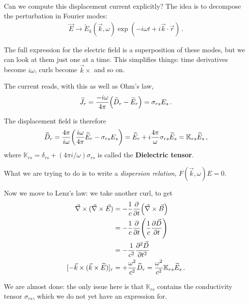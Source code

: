\documentclass[main.tex]{subfiles}
\begin{document}
Can we compute this displacement current explicitly?
The idea is to decompose the perturbation in Fourier modes:
%
\begin{align}
 \vec{E} \to \widetilde{E}_k (\vec{k}, \omega ) \exp(- i \omega t + i \vec{k} \cdot \vec{r})
\,.
\end{align}

The full expression for the electric field is a superposition of these modes, but we can look at them just one at a time. 
This simplifies things: time derivatives become \(i \omega \), curls become \(\vec{k} \times \) and so on. 

The current reads, with this as well as Ohm's law,
%
\begin{align}
\widetilde{J} _r = \frac{- i \omega }{4 \pi } \qty(\widetilde{D}_r - \widetilde{E}_r) = \sigma_{rs} E_s
\,.
\end{align}

The displacement field is therefore 
%
\begin{align}
\widetilde{D}_r
= \frac{4 \pi }{ i \omega } \qty(\frac{i \omega }{ 4 \pi } \widetilde{E}_r - \sigma_{rs} E_s) = \widetilde{E}_r
+ i \frac{4 \pi }{\omega } \sigma_{rs} \widetilde{E}_s 
= \mathbb{K}_{rs} \widetilde{E}_s
\,,
\end{align}
%
where \(\mathbb{K}_{rs} = \delta_{rs} + (4 \pi i / \omega ) \sigma_{rs}\) is called the \textbf{Dielectric tensor}.

What we are trying to do is to write a \emph{dispersion relation}, \(F(\vec{k}, \omega ) E = 0\). 

Now we move to Lenz's law: we take another curl, to get 
%
\begin{subequations}
\begin{align}
\vec{\nabla} \times (\vec{\nabla} \times \vec{E}) &= - \frac{1}{c} \pdv{}{t} \qty(\vec{\nabla} \times \vec{B})   \\
&= - \frac{1}{c} \pdv{}{t} \qty( \frac{1}{c}\pdv{\vec{D}}{t})  \\
&= - \frac{1}{c^2} \pdv[2]{\vec{D}}{t}  \\
[- \vec{k} \times (\vec{k} \times \widetilde{E})]_r &= + \frac{\omega^2}{c^2} \widetilde{D}_r = \frac{\omega^2}{c^2} \mathbb{K}_{rs} \widetilde{E}_s
\,.
\end{align}
\end{subequations}

We are almost done: the only issue here is that \(\mathbb{K}_{rs}\) contains the conductivity tensor \(\sigma_{rs}\), which we do not yet have an expression for. 
\end{document}
